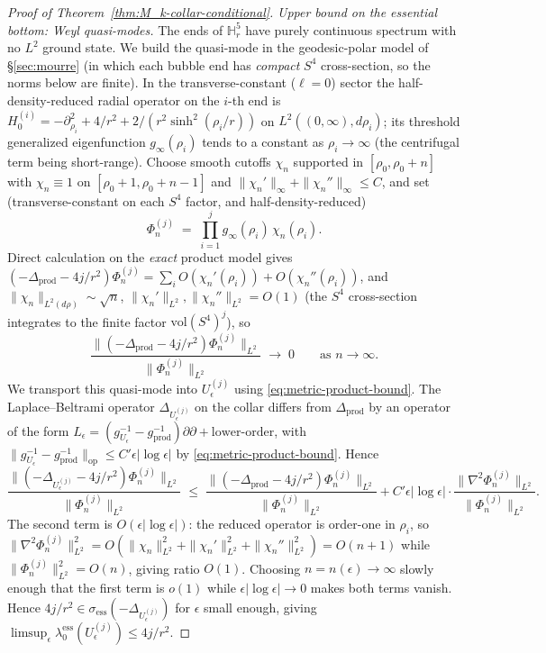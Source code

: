 \documentclass[11pt,letterpaper]{article}
\theoremstyle{definition}
\newcommand{\bbH}{\mathbb{H}}
\newcommand{\Lap}{\Delta}
\begin{document}
\begin{proof}[Proof of Theorem~\ref{thm:M_k-collar-conditional}]
\emph{Upper bound on the essential bottom: Weyl quasi-modes.}
The ends of $\bbH^5_r$ have purely continuous spectrum with no $L^2$ ground state. We build the quasi-mode in the geodesic-polar model of \S\ref{sec:mourre} (in which each bubble end has \emph{compact} $S^4$ cross-section, so the norms below are finite). In the transverse-constant ($\ell=0$) sector the half-density-reduced radial operator on the $i$-th end is $H_0^{(i)} = -\partial_{\rho_i}^2 + 4/r^2 + 2/(r^2\sinh^2(\rho_i/r))$ on $L^2((0,\infty),d\rho_i)$; its threshold generalized eigenfunction $g_\infty(\rho_i)$ tends to a constant as $\rho_i\to\infty$ (the centrifugal term being short-range). Choose smooth cutoffs $\chi_n$ supported in $[\rho_0, \rho_0 + n]$ with $\chi_n\equiv 1$ on $[\rho_0+1, \rho_0+n-1]$ and $\|\chi_n'\|_\infty + \|\chi_n''\|_\infty \le C$, and set (transverse-constant on each $S^4$ factor, and half-density-reduced)
\[
\Phi^{(j)}_n \;=\; \prod_{i=1}^j g_\infty(\rho_i)\,\chi_n(\rho_i).
\]
Direct calculation on the \emph{exact} product model gives $(-\Lap_{\mathrm{prod}} - 4j/r^2)\Phi^{(j)}_n = \sum_i O(\chi_n'(\rho_i)) + O(\chi_n''(\rho_i))$, and $\|\chi_n\|_{L^2(d\rho)} \sim \sqrt{n}$, $\|\chi_n'\|_{L^2}, \|\chi_n''\|_{L^2} = O(1)$ (the $S^4$ cross-section integrates to the finite factor $\mathrm{vol}(S^4)^j$), so
\[
\frac{\|(-\Lap_{\mathrm{prod}} - 4j/r^2)\Phi^{(j)}_n\|_{L^2}}{\|\Phi^{(j)}_n\|_{L^2}} \;\longrightarrow\; 0\qquad\text{as } n \to \infty.
\]
We transport this quasi-mode into $U_\epsilon^{(j)}$ using \eqref{eq:metric-product-bound}. The Laplace--Beltrami operator $\Lap_{U_\epsilon^{(j)}}$ on the collar differs from $\Lap_{\mathrm{prod}}$ by an operator of the form $L_\epsilon = (g_{U_\epsilon}^{-1} - g_{\mathrm{prod}}^{-1})\partial\partial + \text{lower-order}$, with $\|g_{U_\epsilon}^{-1} - g_{\mathrm{prod}}^{-1}\|_{\mathrm{op}} \le C'\epsilon|\log\epsilon|$ by \eqref{eq:metric-product-bound}. Hence
\[
\frac{\|(-\Lap_{U_\epsilon^{(j)}} - 4j/r^2)\Phi^{(j)}_n\|_{L^2}}{\|\Phi^{(j)}_n\|_{L^2}} \;\le\; \frac{\|(-\Lap_{\mathrm{prod}} - 4j/r^2)\Phi^{(j)}_n\|_{L^2}}{\|\Phi^{(j)}_n\|_{L^2}} + C'\epsilon|\log\epsilon|\cdot\frac{\|\nabla^2 \Phi^{(j)}_n\|_{L^2}}{\|\Phi^{(j)}_n\|_{L^2}}.
\]
The second term is $O(\epsilon|\log\epsilon|)$: the reduced operator is order-one in $\rho_i$, so $\|\nabla^2\Phi^{(j)}_n\|_{L^2}^2 = O(\|\chi_n\|_{L^2}^2 + \|\chi_n'\|_{L^2}^2 + \|\chi_n''\|_{L^2}^2) = O(n+1)$ while $\|\Phi^{(j)}_n\|_{L^2}^2 = O(n)$, giving ratio $O(1)$. Choosing $n = n(\epsilon)\to\infty$ slowly enough that the first term is $o(1)$ while $\epsilon|\log\epsilon|\to 0$ makes both terms vanish. Hence $4j/r^2 \in \sigma_{\mathrm{ess}}(-\Lap_{U_\epsilon^{(j)}})$ for $\epsilon$ small enough, giving $\limsup_\epsilon \lambda_0^{\mathrm{ess}}(U_\epsilon^{(j)}) \le 4j/r^2$.


\end{proof}
\end{document}
